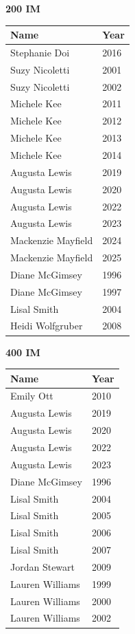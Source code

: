 \hfill
\begin{minipage}[t]{0.48\textwidth}
\centering
\textbf{\textcolor{teamprimary}{200 IM}}\par
\vspace{0.5em}
\centering
\small
\renewcommand{\arraystretch}{1.0}
\setlength{\tabcolsep}{4pt}
\begin{tabular}{@{}p{3.0cm}p{1.0cm}@{}}
\toprule
\textbf{Name} & \textbf{Year} \\
\midrule
Stephanie Doi & 2016 \\
Suzy Nicoletti & 2001 \\
Suzy Nicoletti & 2002 \\
Michele Kee & 2011 \\
Michele Kee & 2012 \\
Michele Kee & 2013 \\
Michele Kee & 2014 \\
Augusta Lewis & 2019 \\
Augusta Lewis & 2020 \\
Augusta Lewis & 2022 \\
Augusta Lewis & 2023 \\
Mackenzie Mayfield & 2024 \\
Mackenzie Mayfield & 2025 \\
Diane McGimsey & 1996 \\
Diane McGimsey & 1997 \\
Lisal Smith & 2004 \\
Heidi Wolfgruber & 2008 \\
\bottomrule
\end{tabular}
\end{minipage}
\vspace{1.2em}
\noindent\begin{minipage}[t]{0.48\textwidth}
\centering
\textbf{\textcolor{teamprimary}{400 IM}}\par
\vspace{0.5em}
\centering
\small
\renewcommand{\arraystretch}{1.0}
\setlength{\tabcolsep}{4pt}
\begin{tabular}{@{}p{3.0cm}p{1.0cm}@{}}
\toprule
\textbf{Name} & \textbf{Year} \\
\midrule
Emily Ott & 2010 \\
Augusta Lewis & 2019 \\
Augusta Lewis & 2020 \\
Augusta Lewis & 2022 \\
Augusta Lewis & 2023 \\
Diane McGimsey & 1996 \\
Lisal Smith & 2004 \\
Lisal Smith & 2005 \\
Lisal Smith & 2006 \\
Lisal Smith & 2007 \\
Jordan Stewart & 2009 \\
Lauren Williams & 1999 \\
Lauren Williams & 2000 \\
Lauren Williams & 2002 \\
\bottomrule
\end{tabular}
\end{minipage}
